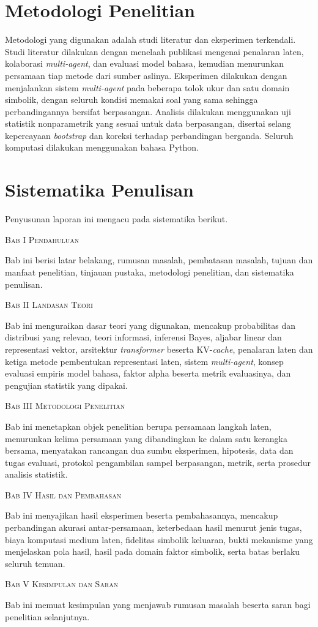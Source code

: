 \section{Metodologi Penelitian}

Metodologi yang digunakan adalah studi literatur dan eksperimen terkendali.
Studi literatur dilakukan dengan menelaah publikasi mengenai penalaran laten,
kolaborasi \textit{multi-agent}, dan evaluasi model bahasa, kemudian
menurunkan persamaan tiap metode dari sumber aslinya. Eksperimen dilakukan
dengan menjalankan sistem \textit{multi-agent} pada beberapa tolok ukur dan
satu domain simbolik, dengan seluruh kondisi memakai soal yang sama sehingga
perbandingannya bersifat berpasangan. Analisis dilakukan menggunakan uji
statistik nonparametrik yang sesuai untuk data berpasangan, disertai selang
kepercayaan \textit{bootstrap} dan koreksi terhadap perbandingan berganda.
Seluruh komputasi dilakukan menggunakan bahasa Python.

\section{Sistematika Penulisan}

Penyusunan laporan ini mengacu pada sistematika berikut.

\noindent\textsc{Bab I Pendahuluan}

Bab ini berisi latar belakang, rumusan masalah, pembatasan masalah, tujuan
dan manfaat penelitian, tinjauan pustaka, metodologi penelitian, dan
sistematika penulisan.

\noindent\textsc{Bab II Landasan Teori}

Bab ini menguraikan dasar teori yang digunakan, mencakup probabilitas dan
distribusi yang relevan, teori informasi, inferensi Bayes, aljabar linear dan
representasi vektor, arsitektur \textit{transformer} beserta KV-\textit{cache},
penalaran laten dan ketiga metode pembentukan representasi laten, sistem
\textit{multi-agent}, konsep evaluasi empiris model bahasa, faktor alpha
beserta metrik evaluasinya, dan pengujian statistik yang dipakai.

\noindent\textsc{Bab III Metodologi Penelitian}

Bab ini menetapkan objek penelitian berupa persamaan langkah laten,
menurunkan kelima persamaan yang dibandingkan ke dalam satu kerangka bersama,
menyatakan rancangan dua sumbu eksperimen, hipotesis, data dan tugas evaluasi,
protokol pengambilan sampel berpasangan, metrik, serta prosedur analisis
statistik.

\noindent\textsc{Bab IV Hasil dan Pembahasan}

Bab ini menyajikan hasil eksperimen beserta pembahasannya, mencakup
perbandingan akurasi antar-persamaan, keterbedaan hasil menurut jenis tugas,
biaya komputasi medium laten, fidelitas simbolik keluaran, bukti mekanisme
yang menjelaskan pola hasil, hasil pada domain faktor simbolik, serta batas
berlaku seluruh temuan.

\noindent\textsc{Bab V Kesimpulan dan Saran}

Bab ini memuat kesimpulan yang menjawab rumusan masalah beserta saran bagi
penelitian selanjutnya.
